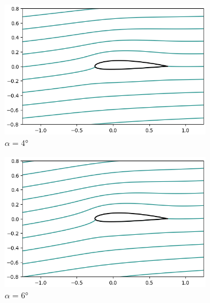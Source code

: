\documentclass[letterpaper, openright, 12pt]{book}
\begin{document}
\begin{figure}
        \begin{subfigure}[c]{0.48\textwidth}
            \includegraphics[keepaspectratio, width=0.99\textwidth]
                {./img/potential_flow_2412_stream_4}
            \caption{$\alpha = 4\si{\degree}$}
            \label{fig:potential_flow_2412_stream_4}
        \end{subfigure}
        \hfill
        \begin{subfigure}[c]{0.48\textwidth}
            \includegraphics[keepaspectratio, width=0.99\textwidth]
                {./img/potential_flow_2412_stream_6}
            \caption{$\alpha = 6\si{\degree}$}
            \label{fig:potential_flow_2412_stream_6}
        \end{subfigure}
        \begin{subfigure}[c]{0.48\textwidth}

\end{subfigure}
\end{figure}
\end{document}
